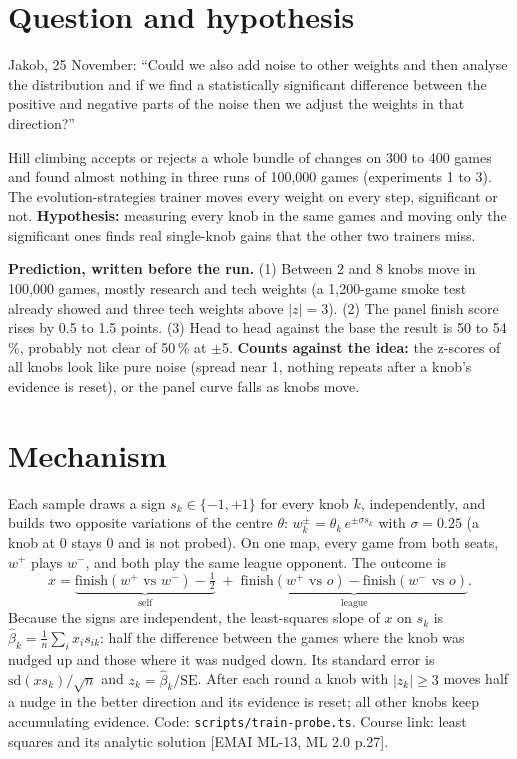 \documentclass{../polyexp}
\begin{document}

\ExpHeader

\section{Question and hypothesis}
Jakob, 25 November: ``Could we also add noise to other weights and then analyse the distribution and if we find a statistically significant difference between the positive and negative parts of the noise then we adjust the weights in that direction?''

Hill climbing accepts or rejects a whole bundle of changes on 300 to 400 games and found almost nothing in three runs of 100,000 games (experiments 1 to 3). The evolution-strategies trainer moves every weight on every step, significant or not. \textbf{Hypothesis:} measuring every knob in the same games and moving only the significant ones finds real single-knob gains that the other two trainers miss.

\textbf{Prediction, written before the run.} (1) Between 2 and 8 knobs move in 100,000 games, mostly research and tech weights (a 1,200-game smoke test already showed  and three tech weights above $|z|=3$). (2) The panel finish score rises by 0.5 to 1.5 points. (3) Head to head against the base the result is 50 to 54\,\%, probably not clear of 50\,\% at $\pm$5. \textbf{Counts against the idea:} the z-scores of all knobs look like pure noise (spread near 1, nothing repeats after a knob's evidence is reset), or the panel curve falls as knobs move.

\section{Mechanism}
Each sample draws a sign $s_k\in\{-1,+1\}$ for every knob $k$, independently, and builds two opposite variations of the centre $\theta$: $w^{\pm}_k=\theta_k\,e^{\pm\sigma s_k}$ with $\sigma=0.25$ (a knob at 0 stays 0 and is not probed). On one map, every game from both seats, $w^+$ plays $w^-$, and both play the same league opponent. The outcome is
\[ x = \underbrace{\mathrm{finish}(w^+\text{ vs }w^-)-\tfrac12}_{\text{self}} \;+\; \underbrace{\mathrm{finish}(w^+\text{ vs }o)-\mathrm{finish}(w^-\text{ vs }o)}_{\text{league}} . \]
Because the signs are independent, the least-squares slope of $x$ on $s_k$ is $\hat\beta_k=\frac1n\sum_i x_i s_{ik}$: half the difference between the games where the knob was nudged up and those where it was nudged down. Its standard error is $\mathrm{sd}(x s_k)/\sqrt n$ and $z_k=\hat\beta_k/\mathrm{SE}$. After each round a knob with $|z_k|\ge 3$ moves half a nudge in the better direction and its evidence is reset; all other knobs keep accumulating evidence. Code: \texttt{scripts/train-probe.ts}. Course link: least squares and its analytic solution [EMAI ML-13, ML 2.0 p.27].
\end{document}
